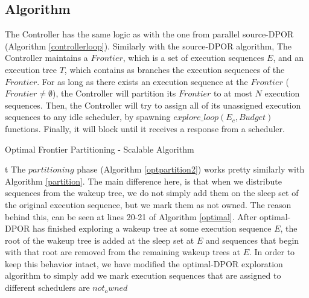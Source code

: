 \subsection{Algorithm}

The Controller has the same logic as with the one from parallel source-DPOR (Algorithm \ref{controllerloop}). Similarly with the source-DPOR algorithm, The Controller maintains a $Frontier$, 
which is a set of execution sequences $E$, and an execution tree $T$, which contains
as branches the execution sequences of the $Frontier$. For as long as there exists an execution sequence at the $Frontier$ 
($Frontier \neq \emptyset$), the Controller will partition its $Frontier$ to at most $N$ execution sequences. Then, the Controller
will try to assign all of its unassigned execution sequences to any idle scheduler, by spawning $explore\_loop(E_c, Budget)$
functions. Finally, it will block until it receives a response from a scheduler.

\begin{algorithm}
    \caption{Optimal Frontier Partitioning - Scalable Algorithm}
    \label{optpartition2}

\end{algorithm}
t
The $partitioning$ phase (Algorithm \ref{optpartition2}) works pretty similarly with Algorithm \ref{partition}. The main difference here, is that when we distribute sequences from the wakeup tree, we do not simply add them on the sleep set of the original execution sequence, but we mark them as not owned. The reason behind this, can be seen at lines 20-21 of Algorithm \ref{optimal}. After optimal-DPOR has finished exploring a wakeup tree at some execution sequence $E$,
the root of the wakeup tree is added at the sleep set at $E$ and sequences that begin with that root are removed from the remaining wakeup trees at $E$. In order to keep this behavior intact, we have modified the optimal-DPOR exploration algorithm to simply add we mark execution sequences that are assigned to different schedulers are $not_owned$

